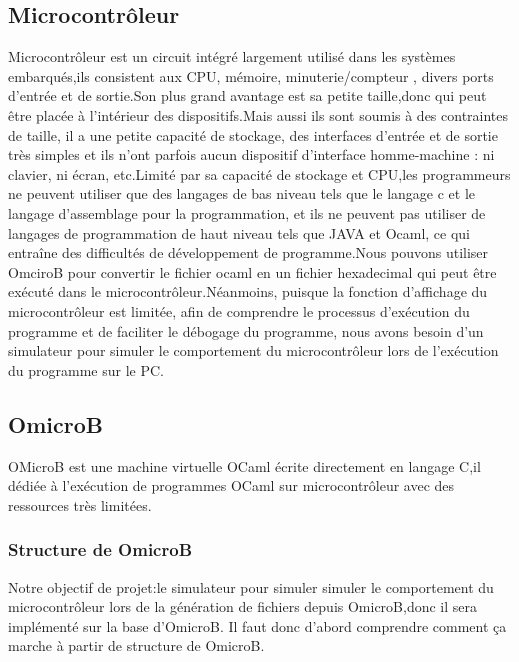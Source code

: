 \documentclass[14px]{article}
\begin{document}
\subsection{Microcontrôleur}
Microcontrôleur est un circuit intégré largement utilisé dans les systèmes embarqués,ils consistent aux CPU, mémoire, minuterie/compteur , divers ports d'entrée et de sortie.Son plus grand avantage est sa petite taille,donc qui peut être placée à l'intérieur des dispositifs.Mais aussi ils sont soumis à des contraintes de taille, il a une petite capacité de stockage, des interfaces d'entrée et de sortie très simples et ils n'ont parfois aucun dispositif d'interface homme-machine : ni clavier, ni écran, etc.Limité par sa capacité de stockage et CPU,les programmeurs ne peuvent utiliser que des langages de bas niveau tels que le langage c et le langage d'assemblage pour la programmation, et ils ne peuvent pas utiliser de langages de programmation de haut niveau tels que JAVA et Ocaml, ce qui entraîne des difficultés de développement de programme.Nous pouvons utiliser OmciroB pour convertir le fichier ocaml en un fichier hexadecimal qui peut être exécuté dans le microcontrôleur.Néanmoins,
puisque la fonction d'affichage du microcontrôleur est limitée, afin de comprendre le processus d'exécution du programme et de faciliter le débogage du programme, nous avons besoin d'un simulateur pour simuler le comportement du microcontrôleur lors de l'exécution du programme sur le PC.
\subsection{OmicroB}
OMicroB est une machine virtuelle OCaml écrite directement en langage C,il dédiée à l'exécution de programmes OCaml sur microcontrôleur avec des ressources très limitées.\\

\subsubsection{Structure de OmicroB}
Notre objectif de projet:le simulateur pour simuler simuler le comportement du microcontrôleur lors de la génération de fichiers depuis OmicroB,donc il sera implémenté sur la base d'OmicroB. Il faut donc d'abord comprendre comment ça marche à partir de structure de OmicroB.\\

\clearpage
\end{document}
